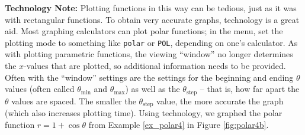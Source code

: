 \noindent\textbf{Technology Note:} Plotting functions in this way can be tedious, just as it was with rectangular functions. To obtain very accurate graphs, technology is a great aid. Most graphing calculators can plot polar functions; in the menu, set the plotting mode to something like \texttt{polar} or \texttt{POL}, depending on one's calculator. As with plotting parametric functions, the viewing ``window'' no longer determines the $x$-values that are plotted, so additional information needs to be provided. Often with the ``window'' settings are the settings for  the beginning and ending $\theta$ values (often called \texttt{$\theta_{\text{min}}$} and \texttt{$\theta_{\text{max}}$}) as well as the \texttt{$\theta_{\text{step}}$} -- that is, how far apart the $\theta$ values are spaced. The smaller the \texttt{$\theta_{\text{step}}$} value, the more accurate the graph (which also increases plotting time). Using technology, we graphed the polar function $r=1+\cos \theta$ from Example \ref{ex_polar4} in Figure \ref{fig:polar4b}.
\\

